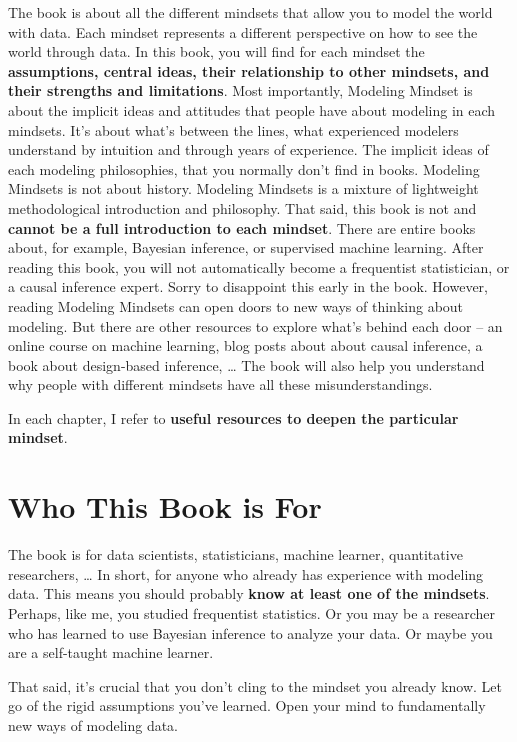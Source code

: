 \documentclass[
  10pt,
]{scrbook}
\begin{document}
The book is about all the different mindsets that allow you to model the world with data.
Each mindset represents a different perspective on how to see the world through data.
In this book, you will find for each mindset the \textbf{assumptions, central ideas, their relationship to other mindsets, and their strengths and limitations}.
Most importantly, Modeling Mindset is about the implicit ideas and attitudes that people have about modeling in each mindsets.
It's about what's between the lines, what experienced modelers understand by intuition and through years of experience.
The implicit ideas of each modeling philosophies, that you normally don't find in books.
Modeling Mindsets is not about history.
Modeling Mindsets is a mixture of lightweight methodological introduction and philosophy.
That said, this book is not and \textbf{cannot be a full introduction to each mindset}.
There are entire books about, for example, Bayesian inference, or supervised machine learning.
After reading this book, you will not automatically become a frequentist statistician, or a causal inference expert.
Sorry to disappoint this early in the book.
However, reading Modeling Mindsets can open doors to new ways of thinking about modeling.
But there are other resources to explore what's behind each door -- an online course on machine learning, blog posts about about causal inference, a book about design-based inference, \ldots{}
The book will also help you understand why people with different mindsets have all these misunderstandings.

In each chapter, I refer to \textbf{useful resources to deepen the particular mindset}.

\hypertarget{who-this-book-is-for}{%
\section{Who This Book is For}\label{who-this-book-is-for}}

The book is for data scientists, statisticians, machine learner, quantitative researchers, \ldots{}
In short, for anyone who already has experience with modeling data.
This means you should probably \textbf{know at least one of the mindsets}.
Perhaps, like me, you studied frequentist statistics.
Or you may be a researcher who has learned to use Bayesian inference to analyze your data.
Or maybe you are a self-taught machine learner.

That said, it's crucial that you don't cling to the mindset you already know.
Let go of the rigid assumptions you've learned.
Open your mind to fundamentally new ways of modeling data.
\end{document}
